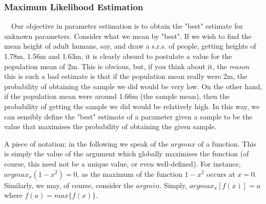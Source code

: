 \documentclass[12pt,a4paper]{article}
\begin{document}
\subsubsection{Maximum Likelihood Estimation}

$\quad$Our objective in parameter estimation is to obtain the "best" estimate for unknown parameters. Consider what we mean by "best". If we wish to find the mean height of adult humans, say, and draw a s.r.s. of people, getting heights of 1.78m, 1.56m and 1.63m, it is clearly absurd to postulate a value for the population mean of 2m. This is obvious, but, if you think about it, the \emph{reason} this is such a bad estimate is that if the population mean really were 2m, the probability of obtaining the sample we did would be very low. On the other hand, if the population mean were around 1.66m (the sample mean), then the probability of getting the sample we did would be relatively high. In this way, we can sensibly define the "best" estimate of a parameter given a sample to be the value that maximises the probability of obtaining the given sample.

A piece of notation: in the following we speak of the $argmax$ of a function. This is simply the value of the argument which globally maximises the function (of course, this need not be a unique value, or even well-defined). For instance, $argmax_x (1-x^2) = 0$, as the maximum of the function $1 - x^2$ occurs at $x=0$. Similarly, we may, of course, consider the $argmin$. Simply, $argmax_x[f(x)] = a$ where $f(a) = max\{f(x)\}$.
\end{document}
